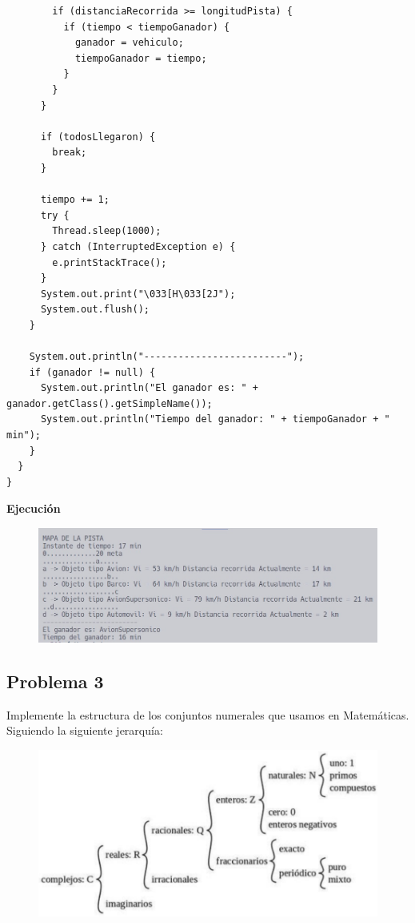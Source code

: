 \documentclass[11pt, twocolumn]{article}
\begin{document}
\begin{lstlisting}
        if (distanciaRecorrida >= longitudPista) {
          if (tiempo < tiempoGanador) {
            ganador = vehiculo;
            tiempoGanador = tiempo;
          }
        }
      }

      if (todosLlegaron) {
        break; 
      }

      tiempo += 1; 
      try {
        Thread.sleep(1000); 
      } catch (InterruptedException e) {
        e.printStackTrace();
      }
      System.out.print("\033[H\033[2J");
      System.out.flush();
    }

    System.out.println("-------------------------");
    if (ganador != null) {
      System.out.println("El ganador es: " + ganador.getClass().getSimpleName());
      System.out.println("Tiempo del ganador: " + tiempoGanador + " min");
    }
  }
}
  \end{lstlisting}  
  
  \newpage
  \textbf{Ejecución}
  \begin{figure}[ht]
    \includegraphics[width=\columnwidth, center]{P2.jpg}
  \end{figure}

  \subsection*{Problema 3}
  Implemente la estructura de los conjuntos numerales que usamos en Matemáticas. Siguiendo la siguiente jerarquía:
  \begin{figure}[ht]
    \includegraphics[width=\columnwidth, center]{jerarquia.png}
  \end{figure}
\end{document}
